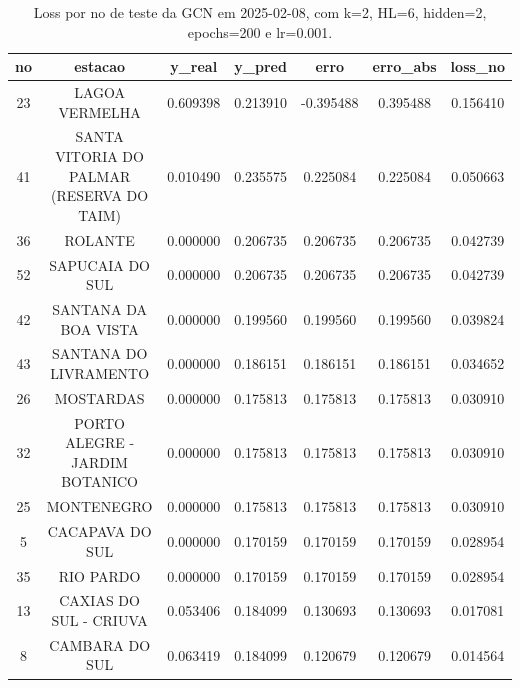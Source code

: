 \begin{table}[h]
\centering
\caption{Loss por no de teste da GCN em 2025-02-08, com k=2, HL=6, hidden=2, epochs=200 e lr=0.001.}
\label{tab:gcn_loss_k2_hl6_h2_e200_d20250208}
\begin{tabular}{ccccccc}
\toprule
no & estacao & y\_real & y\_pred & erro & erro\_abs & loss\_no \\
\midrule
23 & LAGOA VERMELHA & 0.609398 & 0.213910 & -0.395488 & 0.395488 & 0.156410 \\
41 & SANTA VITORIA DO PALMAR (RESERVA DO TAIM) & 0.010490 & 0.235575 & 0.225084 & 0.225084 & 0.050663 \\
36 & ROLANTE & 0.000000 & 0.206735 & 0.206735 & 0.206735 & 0.042739 \\
52 & SAPUCAIA DO SUL & 0.000000 & 0.206735 & 0.206735 & 0.206735 & 0.042739 \\
42 & SANTANA DA BOA VISTA & 0.000000 & 0.199560 & 0.199560 & 0.199560 & 0.039824 \\
43 & SANTANA DO LIVRAMENTO & 0.000000 & 0.186151 & 0.186151 & 0.186151 & 0.034652 \\
26 & MOSTARDAS & 0.000000 & 0.175813 & 0.175813 & 0.175813 & 0.030910 \\
32 & PORTO ALEGRE - JARDIM BOTANICO & 0.000000 & 0.175813 & 0.175813 & 0.175813 & 0.030910 \\
25 & MONTENEGRO & 0.000000 & 0.175813 & 0.175813 & 0.175813 & 0.030910 \\
5 & CACAPAVA DO SUL & 0.000000 & 0.170159 & 0.170159 & 0.170159 & 0.028954 \\
35 & RIO PARDO & 0.000000 & 0.170159 & 0.170159 & 0.170159 & 0.028954 \\
13 & CAXIAS DO SUL - CRIUVA & 0.053406 & 0.184099 & 0.130693 & 0.130693 & 0.017081 \\
8 & CAMBARA DO SUL & 0.063419 & 0.184099 & 0.120679 & 0.120679 & 0.014564 \\
\bottomrule
\end{tabular}
\end{table}
